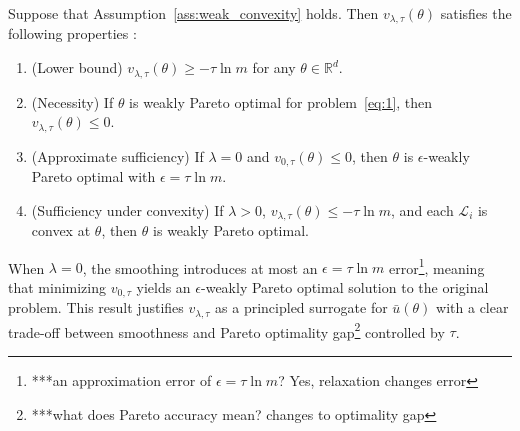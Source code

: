 \documentclass[sigconf]{acmart}
\begin{document}
\begin{proposition}
\label{theov}
Suppose that Assumption~\ref{ass:weak_convexity} holds. Then $v_{\lambda,\tau}(\theta)$ satisfies the following properties :
\begin{enumerate}
    \item (Lower bound) $v_{\lambda,\tau}(\theta) \ge -\tau \ln m$ for any $\theta \in \mathbb{R}^d$.
    \item (Necessity) If $\theta$ is weakly Pareto optimal for problem~\eqref{eq:1}, then $v_{\lambda,\tau}(\theta) \le 0$.
    \item (Approximate sufficiency) If $\lambda = 0$ and $v_{0,\tau}(\theta) \le 0$, then $\theta$ is $\epsilon$-weakly Pareto optimal with $\epsilon = \tau \ln m$.
    \item (Sufficiency under convexity) If $\lambda > 0$, $v_{\lambda,\tau}(\theta) \le -\tau \ln m$, and each $\mathcal{L}_i$ is convex at $\theta$, then $\theta$ is weakly Pareto optimal.
\end{enumerate}
\end{proposition}
When $\lambda = 0$, the smoothing introduces at most an $\epsilon = \tau \ln m$ error\footnote{***an approximation error of $\epsilon = \tau \ln m$?  Yes, relaxation changes error}, meaning that minimizing $v_{0,\tau}$ yields an $\epsilon$-weakly Pareto optimal solution to the original problem. This result justifies $v_{\lambda,\tau}$ as a principled surrogate for $\bar{u}(\theta)$ with a clear trade-off between smoothness and Pareto optimality gap\footnote{***what does Pareto accuracy mean? changes to optimality gap} controlled by $\tau$.
\end{document}
